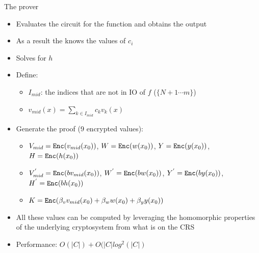 \documentclass[handout]{beamer}
\begin{document}
\begin{frame}{The prover}
\begin{tiny}
\begin{itemize}
    \item Evaluates the circuit for the function and obtains the output \pause
    \item As a result the \prv knows the values of $c_i$ \pause
    \item Solves for $h$ \pause
    \item Define:
    \begin{itemize}
        \item $I_{mid}$: the indices that are not in IO of $f$ ($ \{ N+1 \cdots m \} $) \pause
        \item $v_{mid}(x) = \sum_{k \in I_{mid}} c_k v_k(x)$ \pause
    \end{itemize}
    \item Generate the proof (9 encrypted values): \pause
    \begin{itemize}
        \item $V_{mid} = \mathtt{Enc}(v_{mid}(x_0))$, $W = \mathtt{Enc}(w(x_0))$,  
        $Y=\mathtt{Enc}(y(x_0))$, $H = \mathtt{Enc}(h(x_0))$ \pause
        \item $V_{mid}^{'} = \mathtt{Enc}(b v_{mid}(x_0))$, $W^{'} = \mathtt{Enc}(b w(x_0))$, $Y^{'}=\mathtt{Enc}(by(x_0))$, $H^{'} = \mathtt{Enc}(bh(x_0))$ \pause
        \item $K = \mathtt{Enc}(\beta_v v_{mid}(x_0) + \beta_w w(x_0)+\beta_y y(x_0)) $ \pause
    \end{itemize}
    \item All these values can be computed by leveraging the homomorphic properties of the underlying cryptosystem from what is on the CRS 
    \item Performance: $O(|C|)+O(|C|log^2(|C|)$
\end{itemize}
\end{tiny}
\end{frame}
\end{document}
